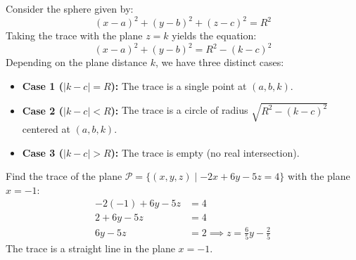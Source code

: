 \begin{example}
Consider the sphere given by:
\[
(x - a)^2 + (y - b)^2 + (z - c)^2 = R^2
\]
Taking the trace with the plane $z = k$ yields the equation:
\[
(x - a)^2 + (y - b)^2 = R^2 - (k - c)^2
\]
Depending on the plane distance $k$, we have three distinct cases:
\begin{itemize}
    \item \textbf{Case 1 ($|k - c| = R$):} The trace is a single point at $(a, b, k)$.
    \item \textbf{Case 2 ($|k - c| < R$):} The trace is a circle of radius $\sqrt{R^2 - (k - c)^2}$ centered at $(a, b, k)$.
    \item \textbf{Case 3 ($|k - c| > R$):} The trace is empty (no real intersection).
\end{itemize}

\begin{center}
\end{center}
\end{example}

\begin{example}
Find the trace of the plane $\mathcal{P} = \{(x, y, z) \mid -2x + 6y - 5z = 4\}$ with the plane $x = -1$:
\begin{align*}
-2(-1) + 6y - 5z &= 4 \\
2 + 6y - 5z &= 4 \\
6y - 5z &= 2 \implies z = \frac{6}{5}y - \frac{2}{5}
\end{align*}
The trace is a straight line in the plane $x = -1$.
\end{example}


